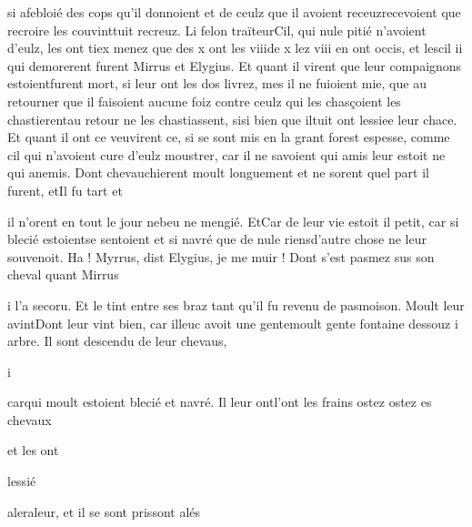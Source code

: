 \documentclass{article}
\begin{document}
\begin{pages}
                        si afebloié des cops qu’il donnoient et de ceulz que il 
                        avoient receuzrecevoient que recroire les couvinttuit recreuz. 
                  Li felon traïteurCil, qui nule pitié n’avoient d’eulz, 
                  les ont tiex menez que 
                  des x ont les viiide x lez viii en ont occis, et 
                  lescil
               ii qui demorerent furent 
                  Mirrus et Elygius. Et quant il virent que leur
               compaignons 
                  estoientfurent mort, si leur ont les dos livrez, mes il ne fuioient mie, que 
                  au retourner que il faisoient aucune foiz contre 
                        ceulz qui les chasçoient les chastierentau retour ne les chastiassent, 
                  sisi bien que 
                  iltuit ont lessiee leur chace. Et quant il 
                  ont ce veuvirent ce, si se sont mis en la grant
                  forest espesse, comme cil qui n’avoient cure d’eulz moustrer, car il ne
               savoient qui amis leur estoit ne qui anemis. Dont chevauchierent moult longuement et
               ne sorent quel part il furent, 
                  etIl fu tart et
               
                  il n’orent en tout le jour 
                  nebeu ne mengié. 
                  EtCar de leur vie estoit il petit, car si blecié 
                  estoientse sentoient et si navré que
                  de nule riensd'autre chose  ne leur souvenoit. Ha ! Myrrus, dist Elygius, je me muir ! Dont s’est pasmez sus son cheval quant
                  Mirrus
               
                  
                  i l’a secoru. Et le tint entre ses braz tant qu’il fu revenu 
                  de pasmoison. \pend
            \pstart 
                  Moult leur avintDont leur vint bien, car illeuc avoit une 
                  gentemoult gente fontaine dessouz i arbre. Il sont descendu de leur chevaus, 
                  
                  i
               
                  carqui moult estoient blecié et navré. Il 
                  leur ontl'ont les frains 
                  ostez
                  ostez es chevaux
               
                  et les ont
               
                  lessié
               
                  aleraleur, et 
                  il se sont prissont alés
               

\end{pages}
\end{document}
